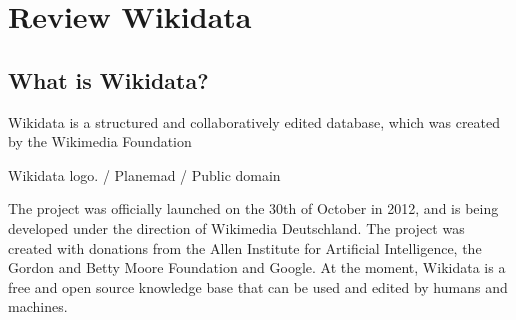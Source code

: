 \setchapterpreamble[u]{\margintoc}
\chapter{Review Wikidata}


\section{What is Wikidata?}
Wikidata is a structured and collaboratively edited database, which was created by the Wikimedia Foundation \begin{marginfigure}[1.5cm]
{
	\setlength{\fboxsep}{0pt}%
	\setlength{\fboxrule}{1pt}%
}
\caption
{Wikidata logo.  / Planemad / Public domain
}
\label{fig:seyu}
\end{marginfigure}The project was officially launched on the 30th of October in 2012, and is being developed under the direction of Wikimedia Deutschland. The project was created with donations from the Allen Institute for Artificial Intelligence, the Gordon and Betty Moore Foundation and Google. At the moment, Wikidata is a free and open source knowledge base that can be used and edited by humans and machines.


